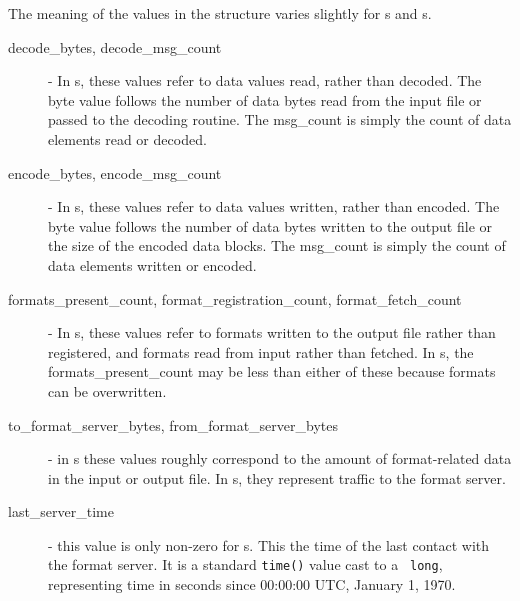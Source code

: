 The meaning of the values in the  structure varies
slightly for s and s.
\begin{description}
\item[decode\_bytes, decode\_msg\_count] - In s, these values
refer to data values read, rather than decoded.  The byte value follows the
number of data bytes read from the input file or passed to the decoding
routine.  The msg\_count is simply the count of data elements read or decoded.
\item[encode\_bytes, encode\_msg\_count] - In s, these values
refer to data values written, rather than encoded.  The byte value follows the
number of data bytes written to the output file or the size of the encoded
data blocks.  The msg\_count is simply the count of data elements written or
encoded.
\item[formats\_present\_count, format\_registration\_count,
format\_fetch\_count] - In s, these values refer to formats
written to the output file rather than registered, and formats read from
input rather than fetched.  In s, the
formats\_present\_count may be less than either of these because formats can
be overwritten.
\item[to\_format\_server\_bytes, from\_format\_server\_bytes] - in
s these values roughly correspond to the amount of
format-related data in the input or output file.  In s,
they represent traffic to the format server.
\item[last\_server\_time] - this value is only non-zero for
s.  This the time of the last contact with the format
server.  It is a standard {\tt time()} value cast to a {\tt
long}, representing time in seconds since 00:00:00 UTC, January 1, 1970.

\end{description}


